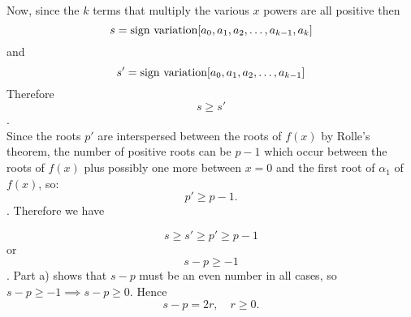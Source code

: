 Now, since the  $k$  terms that multiply the various $x$ powers are all positive then $$ s= \hbox{sign variation} [a_0,a_1,a_2,\hdots,a_{k-1},a_k]$$ and
$$s' = \hbox{sign variation} [a_0,a_1,a_2,\hdots,a_{k-1}]$$ Therefore $$s\ge s'$$.\\

Since the roots $p'$ are interspersed between the roots of $f(x)$ by Rolle's theorem, the number of positive roots can be $p-1$ which occur between the roots of $f(x)$ plus possibly one more between $x=0$ and the first root of $\alpha_1$ of $f(x)$, so: $$p' \ge p -1.$$. Therefore we have 

\[ s \ge s' \ge p' \ge p - 1 \] or \[ s- p \ge -1 \]. Part a) shows that $s-p$ must be an even number in all cases, so $s-p\ge -1 \implies s-p \ge 0$. Hence $$s-p=2r, \quad r \ge 0 .$$


